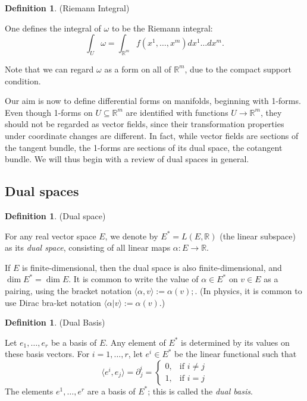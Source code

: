 \documentclass{article}
\theoremstyle{definition}
\newtheorem{defn}[theorem]{Definition}
\newenvironment{definition}
  {\vspace{8pt}\begin{mdframed}[backgroundcolor=blueish,innertopmargin=4]\begin{defn}}
  {\end{defn}\end{mdframed}\vspace{4pt}}
\begin{document}
\begin{definition} (Riemann Integral)

One defines the integral of $\omega$ to be the Riemann integral:
\[ 
    \int_U \omega = \int_{\mathbb R^m} f(x^1 ,\dots, x^m )dx^1 \dots dx^m.
\]
\end{definition}

Note that we can regard $\omega$ as a form on all of $\mathbb R^m$, due to the compact support condition.

Our aim is now to define differential forms on manifolds, beginning with 1-forms. Even though 1-forms on $U \subseteq \mathbb R^m$ are identified with functions $U \rightarrow \mathbb R^m$, they should not be regarded as vector fields, since their transformation properties under coordinate changes are different. In fact, while vector fields are sections of the tangent bundle, the 1-forms are sections of its dual space, the cotangent bundle. We will thus begin with a review of dual spaces in general.

\subsection{Dual spaces}

\begin{definition} (Dual space)

For any real vector space $E$, we denote by $E^* = L(E,\mathbb R)$ (the linear subspace) as its \textit{dual space}, consisting of all linear maps $\alpha : E \rightarrow \mathbb R$.
\end{definition}

If $E$ is finite-dimensional, then the dual space is also finite-dimensional, and $\dim E^* = \dim E$. It is common to write the value of $\alpha \in E^*$ on $v \in E$ as a pairing, using the bracket notation  $\langle \alpha, v \rangle := \alpha(v);$. (In physics, it is common to use Dirac bra-ket notation $\langle \alpha | v \rangle := \alpha(v)$.)

\begin{definition} (Dual Basis)

Let $e_1,\dots, e_r$ be a basis of $E$. Any element of $E^*$ is determined by its values on these basis vectors. For $i = 1,\dots,r$, let $e^i \in E^*$ be the linear functional such that 
\[
    \langle e^i , e_j \rangle = \partial^i_j = 
    \begin{cases}
        0, & \text {if } i \neq j \\ 
        1, & \text{if } i = j
    \end{cases}
\]
The elements $e^1, \dots, e^r$ are a basis of $E^*$; this is called the \textit{dual basis}.
\end{definition}
\end{document}
